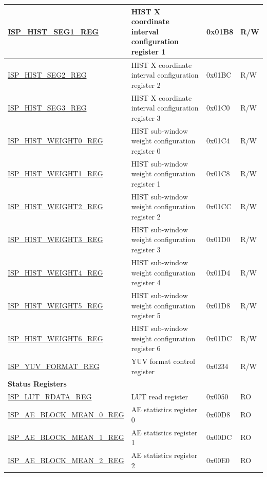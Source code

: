 \begin{longtable}{ | p{6cm} | p{7.2cm} | p{1.3cm} | p{1cm} | }
\hyperref[regdesc:ISPHISTSEG1REG]{ISP\_HIST\_SEG1\_REG} & HIST X coordinate interval configuration register 1 & 0x01B8 & R/W \\ \hline
\hyperref[regdesc:ISPHISTSEG2REG]{ISP\_HIST\_SEG2\_REG} & HIST X coordinate interval configuration register 2 & 0x01BC & R/W \\ \hline
\hyperref[regdesc:ISPHISTSEG3REG]{ISP\_HIST\_SEG3\_REG} & HIST X coordinate interval configuration register 3 & 0x01C0 & R/W \\ \hline
\hyperref[regdesc:ISPHISTWEIGHT0REG]{ISP\_HIST\_WEIGHT0\_REG} & HIST sub-window weight configuration register 0 & 0x01C4 & R/W \\ \hline
\hyperref[regdesc:ISPHISTWEIGHT1REG]{ISP\_HIST\_WEIGHT1\_REG} & HIST sub-window weight configuration register 1 & 0x01C8 & R/W \\ \hline
\hyperref[regdesc:ISPHISTWEIGHT2REG]{ISP\_HIST\_WEIGHT2\_REG} & HIST sub-window weight configuration register 2 & 0x01CC & R/W \\ \hline
\hyperref[regdesc:ISPHISTWEIGHT3REG]{ISP\_HIST\_WEIGHT3\_REG} & HIST sub-window weight configuration register 3 & 0x01D0 & R/W \\ \hline
\hyperref[regdesc:ISPHISTWEIGHT4REG]{ISP\_HIST\_WEIGHT4\_REG} & HIST sub-window weight configuration register 4 & 0x01D4 & R/W \\ \hline
\hyperref[regdesc:ISPHISTWEIGHT5REG]{ISP\_HIST\_WEIGHT5\_REG} & HIST sub-window weight configuration register 5 & 0x01D8 & R/W \\ \hline
\hyperref[regdesc:ISPHISTWEIGHT6REG]{ISP\_HIST\_WEIGHT6\_REG} & HIST sub-window weight configuration register 6 & 0x01DC & R/W \\ \hline
\hyperref[regdesc:ISPYUVFORMATREG]{ISP\_YUV\_FORMAT\_REG} & YUV format control register & 0x0234 & R/W \\ \hline
\multicolumn{4}{|l|}{\textbf{Status Registers}} \\ \hline
\hyperref[regdesc:ISPLUTRDATAREG]{ISP\_LUT\_RDATA\_REG} & LUT read register & 0x0050 & RO \\ \hline
\hyperref[regdesc:ISPAEBLOCKMEAN0REG]{ISP\_AE\_BLOCK\_MEAN\_0\_REG} & AE statistics register 0 & 0x00D8 & RO \\ \hline
\hyperref[regdesc:ISPAEBLOCKMEAN1REG]{ISP\_AE\_BLOCK\_MEAN\_1\_REG} & AE statistics register 1 & 0x00DC & RO \\ \hline
\hyperref[regdesc:ISPAEBLOCKMEAN2REG]{ISP\_AE\_BLOCK\_MEAN\_2\_REG} & AE statistics register 2 & 0x00E0 & RO \\ \hline

\end{longtable}
